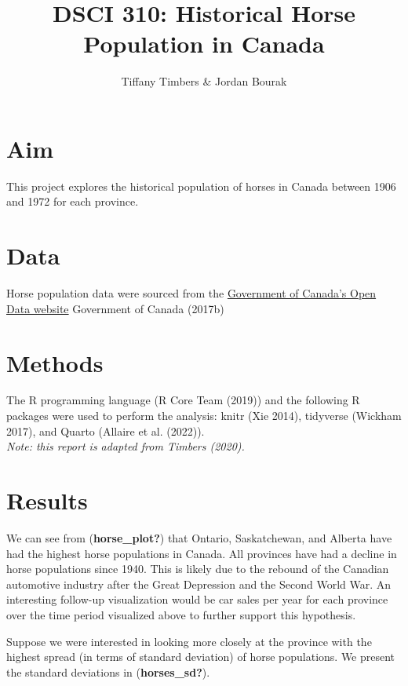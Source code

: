 \documentclass[
  letterpaper,
  DIV=11,
  numbers=noendperiod]{scrartcl}
\title{DSCI 310: Historical Horse Population in Canada}
\author{Tiffany Timbers \& Jordan Bourak}
\date{}
\begin{document}
\maketitle


\section{Aim}\label{aim}

This project explores the historical population of horses in Canada
between 1906 and 1972 for each province.

\section{Data}\label{data}

Horse population data were sourced from the
\href{http://open.canada.ca/en/open-data}{Government of Canada's Open
Data website} Government of Canada (2017b)

\section{Methods}\label{methods}

The R programming language (R Core Team (2019)) and the following R
packages were used to perform the analysis: knitr (Xie 2014), tidyverse
(Wickham 2017), and Quarto (Allaire et al. (2022)).\\
\emph{Note: this report is adapted from Timbers (2020).}

\section{Results}\label{results}

We can see from (\textbf{horse\_plot?}) that Ontario, Saskatchewan, and
Alberta have had the highest horse populations in Canada. All provinces
have had a decline in horse populations since 1940. This is likely due
to the rebound of the Canadian automotive industry after the Great
Depression and the Second World War. An interesting follow-up
visualization would be car sales per year for each province over the
time period visualized above to further support this hypothesis.

Suppose we were interested in looking more closely at the province with
the highest spread (in terms of standard deviation) of horse
populations. We present the standard deviations in
(\textbf{horses\_sd?}).
\end{document}
